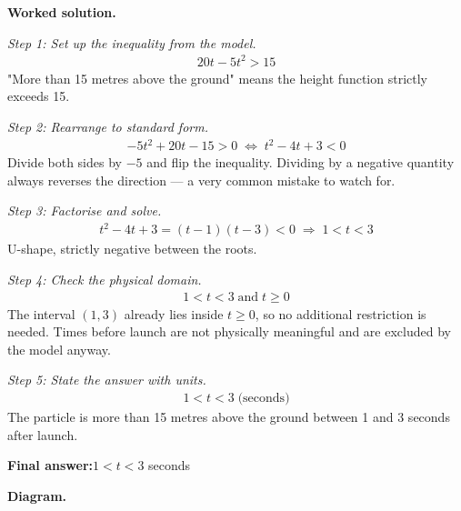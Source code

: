 \documentclass[11pt]{article}
\begin{document}
\textbf{Worked solution.}

\textit{Step 1: Set up the inequality from the model.}
\[\begin{gathered}
20t - 5t^2 > 15
\end{gathered}\]
"More than 15 metres above the ground" means the height function strictly exceeds 15.

\textit{Step 2: Rearrange to standard form.}
\[\begin{gathered}
-5t^2 + 20t - 15 > 0 \;\Longleftrightarrow\; t^2 - 4t + 3 < 0
\end{gathered}\]
Divide both sides by \( -5 \) and flip the inequality. Dividing by a negative quantity always reverses the direction --- a very common mistake to watch for.

\textit{Step 3: Factorise and solve.}
\[\begin{gathered}
t^2 - 4t + 3 = (t - 1)(t - 3) < 0 \;\Longrightarrow\; 1 < t < 3
\end{gathered}\]
U-shape, strictly negative between the roots.

\textit{Step 4: Check the physical domain.}
\[\begin{gathered}
1 < t < 3 \;\text{and}\; t \geq 0
\end{gathered}\]
The interval \( (1, 3) \) already lies inside \( t \geq 0 \), so no additional restriction is needed. Times before launch are not physically meaningful and are excluded by the model anyway.

\textit{Step 5: State the answer with units.}
\[\begin{gathered}
1 < t < 3 \;\text{(seconds)}
\end{gathered}\]
The particle is more than 15 metres above the ground between 1 and 3 seconds after launch.

\begin{answerbox}
\textbf{Final answer:}\quad \(\displaystyle 1 < t < 3\) seconds
\end{answerbox}
\textbf{Diagram.}
\end{document}
